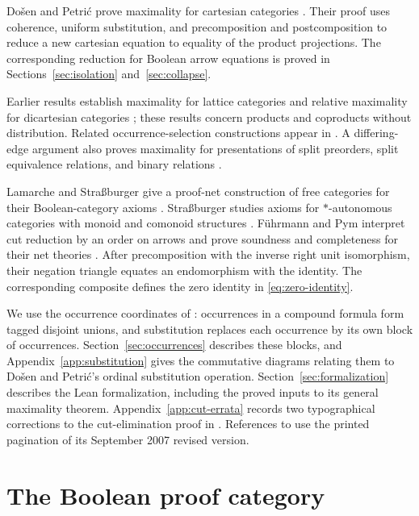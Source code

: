 \documentclass[11pt]{article}
\begin{document}
Do\v{s}en and Petri\'c prove maximality for cartesian categories
\cite[\S5]{DPCartesian}. Their proof uses coherence, uniform
substitution, and precomposition and postcomposition to reduce a new
cartesian equation to equality of the product projections. The
corresponding reduction for Boolean arrow equations is proved in
Sections~\ref{sec:isolation} and~\ref{sec:collapse}.

Earlier results establish maximality for lattice categories and relative
maximality for dicartesian categories
\cite[\S\S8--10]{DPBicartesian}; these results concern products and
coproducts without distribution. Related occurrence-selection
constructions appear in \cite[Lemma~6]{DPIsomorphic}. A differing-edge
argument also proves maximality for presentations of split preorders,
split equivalence relations, and binary relations \cite[\S16]{DPSplit}.

Lamarche and Stra{\ss}burger give a proof-net construction of free
categories for their Boolean-category axioms
\cite[Theorem~3.5.4]{LSFree}.
Stra{\ss}burger studies axioms for $*$-autonomous categories with
monoid and comonoid structures \cite{Strassburger}.
F\"uhrmann and Pym interpret cut reduction by an order on arrows and
prove soundness and completeness for their net theories
\cite[Theorems~6.4--6.5]{FP}.
After precomposition with the inverse right unit isomorphism, their
negation triangle \cite[(11), p.~28]{FP} equates an endomorphism with
the identity. The corresponding composite defines the
zero identity in \eqref{eq:zero-identity}.

We use the occurrence coordinates of \cite[\S9]{Notation}: occurrences
in a compound formula form tagged disjoint unions, and substitution
replaces each occurrence by its own block of occurrences.
Section~\ref{sec:occurrences} describes these blocks, and
Appendix~\ref{app:substitution} gives the commutative diagrams relating
them to Do\v{s}en and Petri\'c's ordinal substitution operation.
Section~\ref{sec:formalization} describes the Lean formalization,
including the proved inputs to its general maximality theorem.
Appendix~\ref{app:cut-errata} records two typographical corrections to the
cut-elimination proof in \cite{DP}.
References to \cite{DP} use the printed
pagination of its September 2007 revised version.

\section{The Boolean proof category}\label{sec:category}
\end{document}
